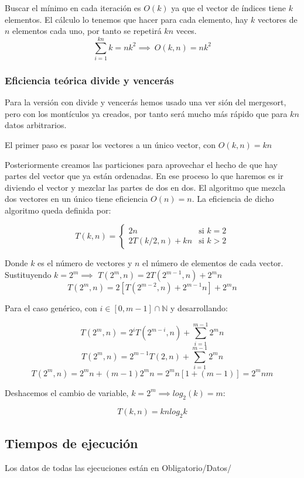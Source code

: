 Buscar el m\'inimo en cada iteraci\'on es $O(k)$ ya que el vector de \'indices tiene $k$ elementos. El c\'alculo lo tenemos que hacer para cada elemento, hay $k$ vectores de $n$ elementos cada uno, por tanto se repetir\'a $kn$ veces.
\[\sum_{i=1}^{kn}k = nk^2 \implies \ O(k,n)=nk^2\]

\subsubsection{Eficiencia te\'orica divide y vencer\'as}
Para la versi\'on con divide y vencer\'as hemos usado una ver	si\'on del mergesort, pero con los mont\'iculos ya creados, por tanto ser\'a mucho m\'as r\'apido que para $kn$ datos arbitrarios. 

El primer paso es pasar los vectores a un \'unico vector, con $O(k,n)=kn$

Posteriormente creamos las particiones para aprovechar el hecho de que hay partes del vector que ya est\'an ordenadas. En ese proceso lo que haremos es ir diviendo el vector y mezclar las partes de dos en dos. El algoritmo que mezcla dos vectores en un \'unico tiene eficiencia $O(n)=n$. La eficiencia de dicho algoritmo queda definida por:

\[T(k,n) = \left \{ 
\begin{matrix} 
		2n & 				\mbox{si } k=2
	\\ 2T(k/2,n) + kn & 		\mbox{si } k>2
\end{matrix}
\right.\]

Donde $k$ es el n\'umero de vectores y $n$ el n\'umero de elementos de cada vector.
Sustituyendo $k=2^m \implies$ $T(2^m, n) = 2T(2^{m-1}, n) + 2^mn$
\[T(2^m, n) = 2\left[ T(2^{m-2}, n) + 2^{m-1}n \right] + 2^mn\]
\begin{center}
	Para el caso gen\'erico, con $i \in \left[0,m-1\right] \cap\mathbb{N}$ y desarrollando:
\end{center}
\[T(2^m, n)	= 2^iT(2^{m-i}, n) + \sum_{i=1}^{m-1} 2^mn\]
\[T(2^m, n) = 2^{m-1} T(2, n) + \sum_{i=1}^{m-1} 2^mn\]
\[T(2^m, n) = 2^mn + (m-1) 2^mn = 2^mn[1+(m-1)] = 2^mnm\]

\begin{center}
	Deshacemos el cambio de variable, $k=2^m \implies log_2(k)=m$:
\end{center}
\[T(k,n) = knlog_2k\]


\subsection{Tiempos de ejecuci\'on}
Los datos de todas las ejecuciones est\'an en Obligatorio/Datos/

